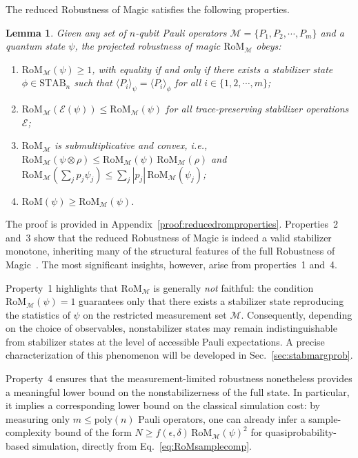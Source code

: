 \documentclass[10pt,aps,pra,twocolumn,floatfix,nofootinbib,superscriptaddress,longbibliography]{revtex4-2}
\newcommand{\1}{\mathbbm{1}}
\newtheorem{lem}[thm]{Lemma}
\begin{document}
The reduced Robustness of Magic satisfies the following properties.
\begin{lem}
    Given any set of $n$-qubit Pauli operators $\mathcal M = \{P_1, P_2, \cdots, P_m\}$ and a quantum state $\psi$, the projected robustness of magic $\mathrm{RoM}_\mathcal M$ obeys:
    \begin{enumerate}
        \item $\mathrm{RoM}_\mathcal M(\psi) \geq 1$, with equality if and only if there exists a stabilizer state $\phi \in \mathrm{STAB}_n$ such that $\langle P_i \rangle_\psi = \langle P_i \rangle_\phi$ for all $i \in \{1,2,\cdots,m\}$;
        \item $\mathrm{RoM}_\mathcal M(\mathcal E(\psi)) \leq \mathrm{RoM}_\mathcal M(\psi)$ for all trace-preserving stabilizer operations $\mathcal E$;
        \item $\mathrm{RoM}_\mathcal M$ is submultiplicative and convex, i.e.,
        $\mathrm{RoM}_\mathcal M(\psi \otimes \rho) \leq \mathrm{RoM}_\mathcal M(\psi)\,\mathrm{RoM}_\mathcal M(\rho)$ and
        $\mathrm{RoM}_\mathcal M\!\left(\sum_j p_j \psi_j\right) \leq \sum_j |p_j|\,\mathrm{RoM}_\mathcal M(\psi_j)$;
        \item $\mathrm{RoM}(\psi) \geq \mathrm{RoM}_\mathcal M(\psi)$.
    \end{enumerate}
\label{lem:reducedROMproperties}
\end{lem}
The proof is provided in Appendix~\ref{proof:reducedromproperties}. Properties~2 and~3 show that the reduced Robustness of Magic is indeed a valid stabilizer monotone, inheriting many of the structural features of the full Robustness of Magic~\cite{howard2017application}. The most significant insights, however, arise from properties~1 and~4.

Property~1 highlights that $\mathrm{RoM}_\mathcal M$ is generally \emph{not} faithful: the condition $\mathrm{RoM}_\mathcal M(\psi)=1$ guarantees only that there exists a stabilizer state reproducing the statistics of $\psi$ on the restricted measurement set $\mathcal M$. Consequently, depending on the choice of observables, nonstabilizer states may remain indistinguishable from stabilizer states at the level of accessible Pauli expectations. A precise characterization of this phenomenon will be developed in Sec.~\ref{sec:stabmargprob}.

Property~4 ensures that the measurement-limited robustness nonetheless provides a meaningful lower bound on the nonstabilizerness of the full state. In particular, it implies a corresponding lower bound on the classical simulation cost: by measuring only $m \leq \mathrm{poly}(n)$ Pauli operators, one can already infer a sample-complexity bound of the form
$N \geq f(\epsilon,\delta)\,\mathrm{RoM}_\mathcal M(\psi)^2$
for quasiprobability-based simulation, directly from Eq.~\eqref{eq:RoMsamplecomp}.
\end{document}
